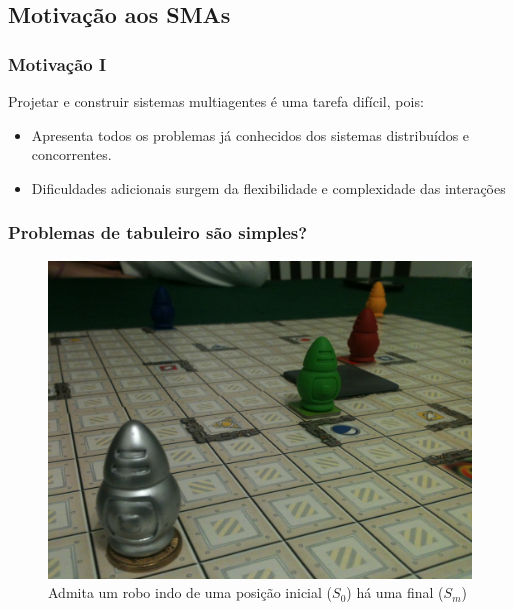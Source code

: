 \subsection{Motivação aos SMAs}
\begin{frame} %

\frametitle{Motivação I}
    Projetar e construir sistemas multiagentes é uma tarefa difícil, pois:
 \begin{itemize}
   \pause
   \item Apresenta todos os problemas já conhecidos 
dos sistemas distribuídos e concorrentes.
   \pause
   \item Dificuldades adicionais surgem da flexibilidade 
e complexidade das interações
    \end{itemize}
\end{frame}



\begin{frame}
\frametitle{Problemas de tabuleiro são simples?}
  
  \begin{figure}[!ht]
  \centering
  \includegraphics[height =.6\textheight,width=.7\textwidth]{figuras/robos_tabuleiro.jpg}
  \caption{Admita um robo indo de uma posição inicial ($S_0$) há uma final 
  ($S_m$)}
\end{figure}
   
\end{frame}


